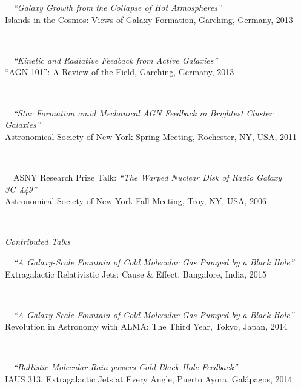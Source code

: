 \documentclass[11pt]{article}
\begin{document}
\hspace{42mm} \parbox{5.15in}{
\textbullet~~\textit{``Galaxy Growth from the Collapse of Hot Atmospheres''}\\ Islands in the Cosmos: Views of Galaxy Formation, Garching, Germany, 2013}\\

\hspace{42mm} \parbox{5.15in}{
\textbullet~~\textit{``Kinetic and Radiative Feedback from Active Galaxies''} \\ ``AGN 101'': A Review of the Field, Garching, Germany, 2013}\\


\hspace{42mm} \parbox{5.15in}{
\textbullet~~\textit{``Star Formation amid Mechanical AGN Feedback in Brightest Cluster Galaxies''}\\ Astronomical Society of New York Spring Meeting, Rochester, NY, USA, 2011}\\


\hspace{42mm} \parbox{5.15in}{
\textbullet~~ASNY Research Prize Talk: \textit{``The Warped Nuclear Disk of Radio Galaxy 3C~449''}\\ Astronomical Society of New York Fall Meeting, Troy, NY, USA, 2006}\\




\vspace{4mm}



\hspace{2.5mm} \parbox{1.5in}{\textit{Contributed Talks}\\} \parbox{5.15in}{
\textbullet~~\textit{``A Galaxy-Scale Fountain of Cold Molecular Gas Pumped by a Black Hole''} \\
Extragalactic Relativistic Jets: Cause \& Effect, Bangalore, India, 2015}\\


\hspace{42mm} \parbox{5.15in}{
\textbullet~~\textit{``A Galaxy-Scale Fountain of Cold Molecular Gas Pumped by a Black Hole''} \\
Revolution in Astronomy with ALMA: The Third Year, Tokyo, Japan, 2014}\\


\hspace{42mm} \parbox{5.15in}{
\textbullet~~\textit{``Ballistic Molecular Rain powers Cold Black Hole Feedback''} \\
IAUS 313, Extragalactic Jets at Every Angle, Puerto Ayora, Gal\'{a}pagos, 2014}\\
\end{document}
